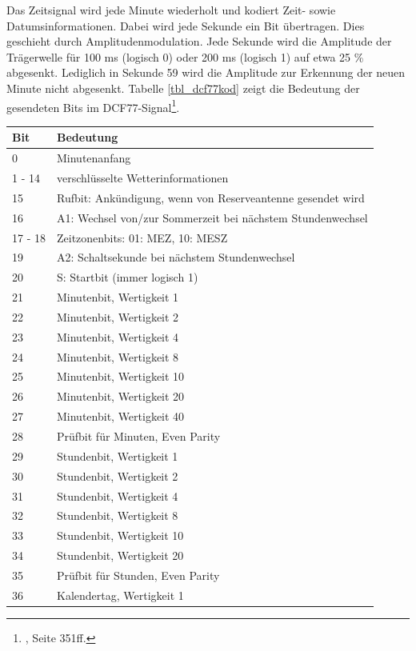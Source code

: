 Das Zeitsignal wird jede Minute wiederholt und kodiert Zeit- sowie Datumsinformationen. Dabei wird jede Sekunde ein Bit übertragen. Dies geschieht durch Amplitudenmodulation. Jede Sekunde wird die Amplitude der Trägerwelle für 100 ms (logisch 0) oder 200 ms (logisch 1) auf etwa 25 \% abgesenkt. Lediglich in Sekunde 59 wird die Amplitude zur Erkennung der neuen Minute nicht abgesenkt. Tabelle \ref{tbl_dcf77kod} zeigt die Bedeutung der gesendeten Bits im DCF77-Signal\footnote{\cite{dcf77}, Seite 351ff.}.
%
\renewcommand{\arraystretch}{1}
\begin{longtable}{|l|l|}
\hline Bit & Bedeutung\\\hline\hline\endhead
\hline\endfoot\endlastfoot
%
0 & Minutenanfang\\\hline
1 - 14 & verschlüsselte Wetterinformationen\\\hline
15 & Rufbit: Ankündigung, wenn von Reserveantenne gesendet wird\\\hline
16 & A1: Wechsel von/zur Sommerzeit bei nächstem Stundenwechsel\\\hline
17 - 18 & Zeitzonenbits: 01: MEZ, 10: MESZ\\\hline
19 & A2: Schaltsekunde bei nächstem Stundenwechsel\\\hline
20 & S: Startbit (immer logisch 1)\\\hline
21 & Minutenbit, Wertigkeit 1\\\hline
22 & Minutenbit, Wertigkeit 2\\\hline
23 & Minutenbit, Wertigkeit 4\\\hline
24 & Minutenbit, Wertigkeit 8\\\hline
25 & Minutenbit, Wertigkeit 10\\\hline
26 & Minutenbit, Wertigkeit 20\\\hline
27 & Minutenbit, Wertigkeit 40\\\hline
28 & Prüfbit für Minuten, Even Parity\\\hline
29 & Stundenbit, Wertigkeit 1\\\hline
30 & Stundenbit, Wertigkeit 2\\\hline
31 & Stundenbit, Wertigkeit 4\\\hline
32 & Stundenbit, Wertigkeit 8\\\hline
33 & Stundenbit, Wertigkeit 10\\\hline
34 & Stundenbit, Wertigkeit 20\\\hline
35 & Prüfbit für Stunden, Even Parity\\\hline
36 & Kalendertag, Wertigkeit 1\\\hline

\end{longtable}
